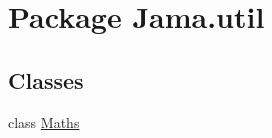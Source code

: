 \hypertarget{namespace_jama_1_1util}{\section{Package Jama.\+util}
\label{namespace_jama_1_1util}
}
\subsection*{Classes}
\begin{DoxyCompactItemize}
\item 
class \hyperlink{class_jama_1_1util_1_1_maths}{Maths}
\end{DoxyCompactItemize}
